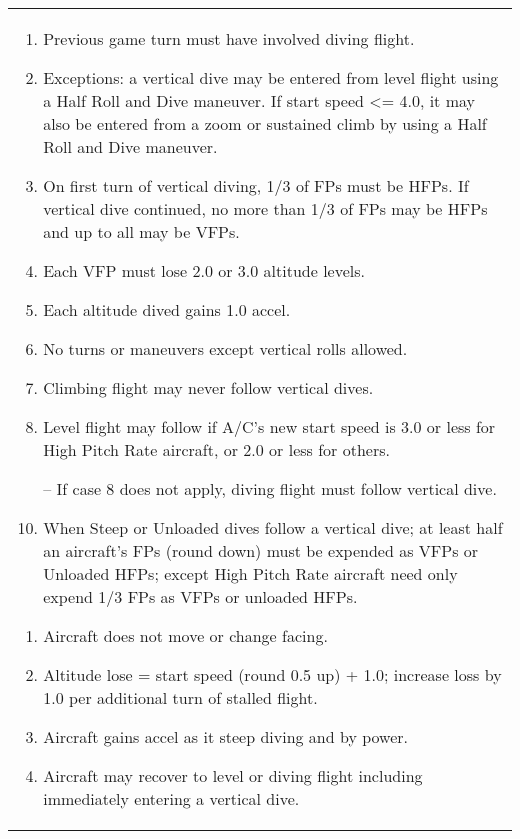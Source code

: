 \begin{twocolumntable}
\begin{tabularx}{\linewidth}{P}
\begin{multicols}{2}

\begin{enumerate}[nosep]
    \item Previous game turn must have involved diving flight.
    \item Exceptions: a vertical dive may be entered from level flight using a Half Roll and Dive maneuver. If start speed <= 4.0, it may also be entered from a zoom or sustained climb by using a Half Roll and Dive maneuver.
    \item On first turn of vertical diving, 1/3 of FPs must be HFPs. If vertical dive continued, no more than 1/3 of FPs may be HFPs and up to all may be VFPs.
    \item Each VFP must lose 2.0 or 3.0 altitude levels.
    \item Each altitude dived gains 1.0 accel.
    \item No turns or maneuvers except vertical rolls allowed.
    \item Climbing flight may never follow vertical dives.
    \item Level flight may follow if A/C's new start speed is 3.0 or less for High Pitch Rate aircraft, or 2.0 or less for others.
    \item[--] If case 8 does not apply, diving flight must follow vertical dive.
    \item When Steep or Unloaded dives follow a vertical dive; at least half an aircraft's FPs (round down) must be expended as VFPs or Unloaded HFPs; except High Pitch Rate aircraft need only expend 1/3 FPs as VFPs or unloaded HFPs.
\end{enumerate}


\begin{enumerate}[nosep]
    \item Aircraft does not move or change facing.
    \item Altitude lose = start speed (round 0.5 up) + 1.0; increase loss by 1.0 per additional turn of stalled flight.
    \item Aircraft gains accel as it steep diving and by power.
    \item Aircraft may recover to level or diving flight including immediately entering a vertical dive.
\end{enumerate}



\end{multicols}
\end{tabularx}
\end{twocolumntable}
